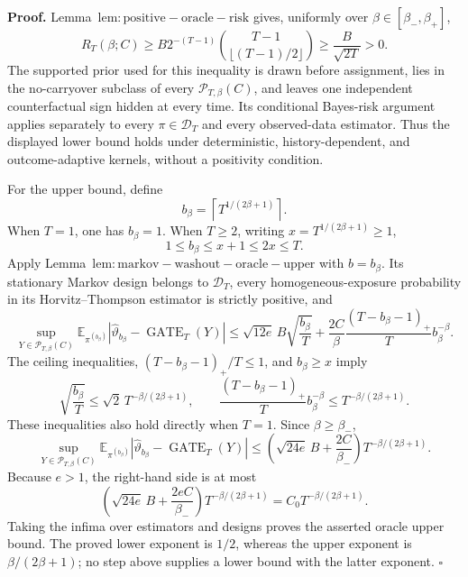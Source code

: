 \textbf{Proof.} Lemma~\(\mathrm{lem:positive-oracle-risk}\) gives, uniformly over \(\beta\in[\beta_-,\beta_+]\),
\[
R_T(\beta;C)
\ge B2^{-(T-1)}\binom{T-1}{\lfloor(T-1)/2\rfloor}
\ge \frac{B}{\sqrt{2T}}>0.
\]
The supported prior used for this inequality is drawn before assignment, lies in the no-carryover subclass of every \(\mathcal P_{T,\beta}(C)\), and leaves one independent counterfactual sign hidden at every time. Its conditional Bayes-risk argument applies separately to every \(\pi\in\mathcal D_T\) and every observed-data estimator. Thus the displayed lower bound holds under deterministic, history-dependent, and outcome-adaptive kernels, without a positivity condition.

For the upper bound, define
\[
b_\beta=\left\lceil T^{1/(2\beta+1)}\right\rceil.
\]
When \(T=1\), one has \(b_\beta=1\). When \(T\ge2\), writing \(x=T^{1/(2\beta+1)}\ge1\),
\[
1\le b_\beta\le x+1\le2x\le T.
\]
Apply Lemma~\(\mathrm{lem:markov-washout-oracle-upper}\) with \(b=b_\beta\). Its stationary Markov design belongs to \(\mathcal D_T\), every homogeneous-exposure probability in its Horvitz--Thompson estimator is strictly positive, and
\[
\sup_{Y\in\mathcal P_{T,\beta}(C)}
\mathbb E_{\pi^{(b_\beta)}}
\left|\widehat\vartheta_{b_\beta}-\operatorname{GATE}_T(Y)\right|
\le
\sqrt{12e}\,B\sqrt{\frac{b_\beta}{T}}
+\frac{2C}{\beta}\frac{(T-b_\beta-1)_+}{T}b_\beta^{-\beta}.
\]
The ceiling inequalities, \((T-b_\beta-1)_+/T\le1\), and \(b_\beta\ge x\) imply
\[
\sqrt{\frac{b_\beta}{T}}
\le \sqrt2\,T^{-\beta/(2\beta+1)},
\qquad
\frac{(T-b_\beta-1)_+}{T}b_\beta^{-\beta}
\le T^{-\beta/(2\beta+1)}.
\]
These inequalities also hold directly when \(T=1\). Since \(\beta\ge\beta_-\),
\[
\sup_{Y\in\mathcal P_{T,\beta}(C)}
\mathbb E_{\pi^{(b_\beta)}}
\left|\widehat\vartheta_{b_\beta}-\operatorname{GATE}_T(Y)\right|
\le
\left(\sqrt{24e}\,B+\frac{2C}{\beta_-}\right)
T^{-\beta/(2\beta+1)}.
\]
Because \(e>1\), the right-hand side is at most
\[
\left(\sqrt{24e}\,B+\frac{2eC}{\beta_-}\right)
T^{-\beta/(2\beta+1)}
=C_0T^{-\beta/(2\beta+1)}.
\]
Taking the infima over estimators and designs proves the asserted oracle upper bound. The proved lower exponent is \(1/2\), whereas the upper exponent is \(\beta/(2\beta+1)\); no step above supplies a lower bound with the latter exponent. \(\square\)